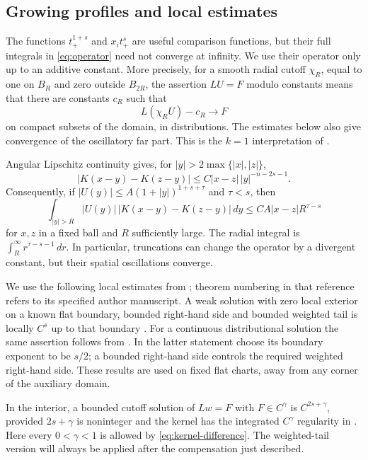 \documentclass[11pt]{article}
\numberwithin{equation}{section}
\begin{document}
\subsection{Growing profiles and local estimates}

The functions $t_+^{1+s}$ and $x_i t_+^s$ are useful comparison functions,
but their full integrals in \eqref{eq:operator} need not converge at infinity.
We use their operator only up to an additive constant. More precisely, for a
smooth radial cutoff $\chi_R$, equal to one on $B_R$ and zero outside $B_{2R}$,
the assertion $LU=F$ modulo constants means that there are constants $c_R$
such that
\[
 L(\chi_R U)-c_R\longrightarrow F
\]
on compact subsets of the domain, in distributions. The estimates below
also give convergence of the oscillatory far part. This is the $k=1$
interpretation of \cite[Definition 3.1]{AR}.

Angular Lipschitz continuity gives, for $|y|>2\max\{|x|,|z|\}$,
\begin{equation}\label{eq:kernel-difference}
 |K(x-y)-K(z-y)|\leq C|x-z|\,|y|^{-n-2s-1}.
\end{equation}
Consequently, if $|U(y)|\leq A(1+|y|)^{1+s+\tau}$ and $\tau<s$, then
\begin{equation}\label{eq:compensated-tail}
 \int_{|y|>R}|U(y)|\,|K(x-y)-K(z-y)|\,dy
       \leq CA|x-z|R^{\tau-s}
\end{equation}
for $x,z$ in a fixed ball and $R$ sufficiently large. The radial integral is
$\int_R^\infty r^{\tau-s-1}\,dr$. In particular, truncations can change
the operator by a divergent constant, but their spatial oscillations converge.

We use the following local estimates from \cite{FRRO}; theorem numbering in
that reference refers to its specified author manuscript. A weak solution
with zero local exterior on a known flat boundary, bounded right-hand side
and bounded weighted tail is locally $C^s$ up to that boundary
\cite[Proposition 2.6.4]{FRRO}. For a continuous distributional solution the
same assertion follows from \cite[Proposition 2.6.13]{FRRO}. In the latter
statement choose its boundary exponent to be $s/2$; a bounded right-hand side
controls the required weighted right-hand side. These results are used on
fixed flat charts, away from any corner of the auxiliary domain.

In the interior, a bounded cutoff solution of $Lw=F$ with $F\in C^\gamma$
is $C^{2s+\gamma}$, provided $2s+\gamma$ is noninteger and the kernel has
the integrated $C^\gamma$ regularity in \cite[Definition 2.1.22]{FRRO}
\cite[Theorem 2.4.1]{FRRO}. Here every $0<\gamma<1$ is allowed by
\eqref{eq:kernel-difference}. The weighted-tail version will always be
applied after the compensation just described.
\end{document}
